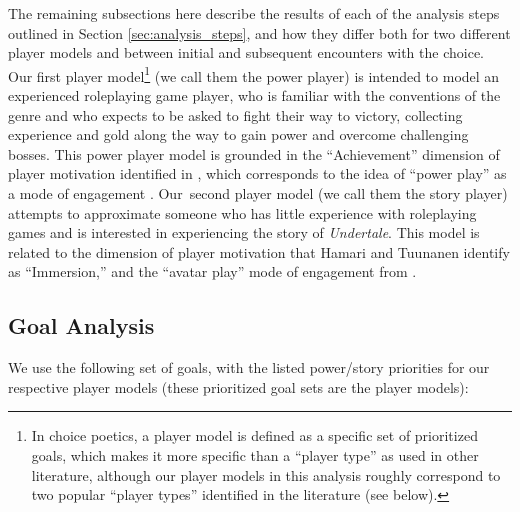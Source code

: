 \documentclass[arts,article,accept,moreauthors,pdftex,10pt,a4paper]{Definitions/mdpi}
\begin{document}
The remaining subsections here describe the results of each of the analysis steps outlined in Section \ref{sec:analysis_steps}, and how they differ both for two different player models and between initial and subsequent encounters with the choice.
%
Our first player model\footnote{In choice poetics, a player model is defined as a specific set of prioritized goals, which makes it more specific than a ``player type'' as used in other literature, although our player models in this analysis roughly correspond to two popular ``player types'' identified in the literature (see below).} (we call them the power player) is intended to model an experienced roleplaying game player, who is familiar with the conventions of the genre and who expects to be asked to fight their way to victory, collecting experience and gold along the way to gain power and overcome challenging bosses.
%
This power player model is grounded in the ``Achievement'' dimension of player motivation identified in \citep{hamari2014player}, which corresponds to the idea of ``power play'' as a mode of engagement \citep{mawhorter2014towards}.
%
Our~second player model (we call them the story player) attempts to approximate someone who has little experience with roleplaying games and is interested in experiencing the story of \emph{Undertale}.
%
This model is related to the dimension of player motivation that Hamari and Tuunanen identify as ``Immersion,'' and the ``avatar play'' mode of engagement from \citep{mawhorter2014towards}.

\subsection{Goal Analysis}

We use the following set of goals, with the listed power/story priorities for our respective player models (these prioritized goal sets are the player models):
\end{document}
